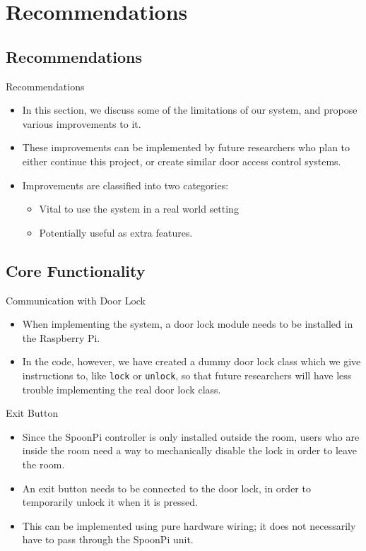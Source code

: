 \section{Recommendations}
\subsection{Recommendations}
\begin{frame}{Recommendations}
\begin{itemize}
    \item<1-> In this section, we discuss some of the limitations of our system, and propose various improvements to it.
    \item<2-> These improvements can be implemented by future researchers who plan to either continue this project, or create similar door access control systems.
    \item<3-> Improvements are classified into two categories:
    \begin{itemize}
    	\item<4-> Vital to use the system in a real world setting
    	\item<5-> Potentially useful as extra features.
	\end{itemize}
\end{itemize}
\end{frame}

\subsection{Core Functionality}
\begin{frame}{Communication with Door Lock}
\begin{itemize}
    \item<1-> When implementing the system, a door lock module needs to be installed in the Raspberry Pi.
    \item<2-> In the code, however, we have created a dummy door lock class which we give instructions to, like \texttt{lock} or \texttt{unlock}, so that future researchers will have less trouble implementing the real door lock class.
\end{itemize}
\end{frame}

\begin{frame}{Exit Button}
\begin{itemize}
    \item<1-> Since the SpoonPi controller is only installed outside the room, users who are inside the room need a way to mechanically disable the lock in order to leave the room.
    \item<2-> An exit button needs to be connected to the door lock, in order to temporarily unlock it when it is pressed.
    \item<3-> This can be implemented using pure hardware wiring; it does not necessarily have to pass through the SpoonPi unit.
\end{itemize}
\end{frame}


